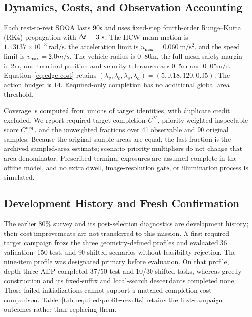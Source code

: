 \subsection{Dynamics, Costs, and Observation Accounting}

Each rest-to-rest SOOA lasts \unit{90}{s} and uses fixed-step fourth-order Runge--Kutta (RK4) propagation with $\Delta t=3~s$. The HCW mean motion is $1.13137\times10^{-3}~\mathrm{rad/s}$, the acceleration limit is $u_{\max}=0.060~\mathrm{m/s^2}$, and the speed limit is $v_{\max}=\unit{2.0}{m/s}$. The vehicle radius is \unit{0.80}{m}, the full-mesh safety margin is \unit{2}{m}, and terminal position and velocity tolerances are \unit{0.5}{m} and \unit{0.05}{m/s}. Equation~\eqref{eq:edge-cost} retains $(\lambda_v,\lambda_e,\lambda_s,\lambda_a)=(5,0.18,120,0.05)$. The action budget is 14. Required-only completion has no additional global area threshold.

Coverage is computed from unions of target identities, with duplicate credit excluded. We report required-target completion $C^{\mathcal K}$, priority-weighted inspectable score $C^{\mathrm{insp}}$, and the unweighted fractions over 41 observable and 90 original samples. Because the original sample areas are equal, the last fraction is the archived sampled-area estimate; scenario priority multipliers do not change that area denominator. Prescribed terminal exposures are assumed complete in the offline model, and no extra dwell, image-resolution gate, or illumination process is simulated.

\subsection{Development History and Fresh Confirmation}

The earlier 80\% survey and its post-selection diagnostics are development history; their cost improvements are not transferred to this mission. A first required-target campaign froze the three geometry-defined profiles and evaluated 36 validation, 150 test, and 90 shifted scenarios without feasibility rejection. The nine-item profile was designated primary before evaluation. On that profile, depth-three ADP completed 37/50 test and 10/30 shifted tasks, whereas greedy construction and its fixed-suffix and local-search descendants completed none. Those failed initializations cannot support a matched-completion cost comparison. Table~\ref{tab:required-profile-results} retains the first-campaign outcomes rather than replacing them.

